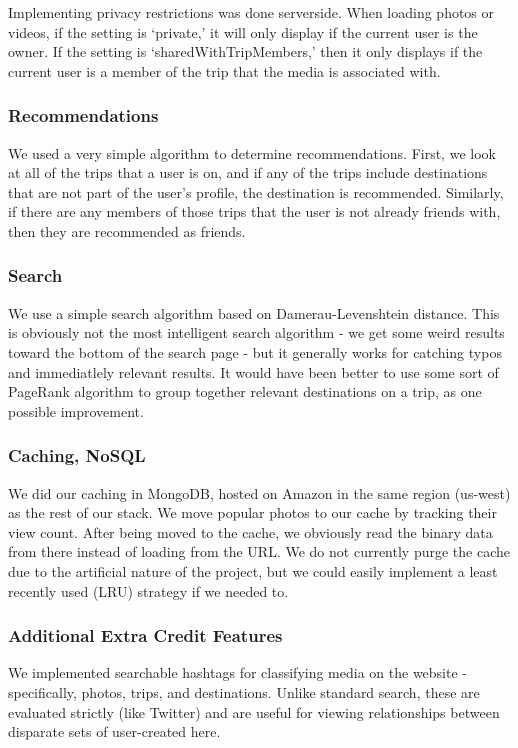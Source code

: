 \documentclass[11pt]{amsart}
\begin{document}
Implementing privacy restrictions was done serverside. When loading photos or videos, if the setting is `private,'
it will only display if the current user is the owner. If the setting is `sharedWithTripMembers,' then it only displays
if the current user is a member of the trip that the media is associated with.
\subsubsection{Recommendations} We used a very simple algorithm to determine recommendations. First, we look at all of the
trips that a user is on, and if any of the trips include destinations that are not part of the user's profile, the destination
is recommended. Similarly, if there are any members of those trips that the user is not already friends with, then they are
recommended as friends.
\subsubsection{Search}
We use a simple search algorithm based on Damerau-Levenshtein distance. This is
obviously not the most intelligent search algorithm - we get some weird results
toward the bottom of the search page - but it generally works for catching typos
and immediatlely relevant results. It would have been better to use some sort of
PageRank algorithm to group together relevant destinations on a trip, as one
possible improvement.
\subsubsection{Caching, NoSQL}
We did our caching in MongoDB, hosted on Amazon in the same region (us-west) as
the rest of our stack. We move popular photos to our cache by tracking their
view count. After being moved to the cache, we obviously read the binary data
from there instead of loading from the URL. We do not currently purge the cache
due to the artificial nature of the project, but we could easily implement a
least recently used (LRU) strategy if we needed to.
\subsubsection{Additional Extra Credit Features}
We implemented searchable hashtags for classifying media on the website - specifically, photos,
trips, and destinations. Unlike standard search, these are evaluated strictly (like Twitter)
and are useful for viewing relationships between disparate sets of user-created here. \\
\end{document}
